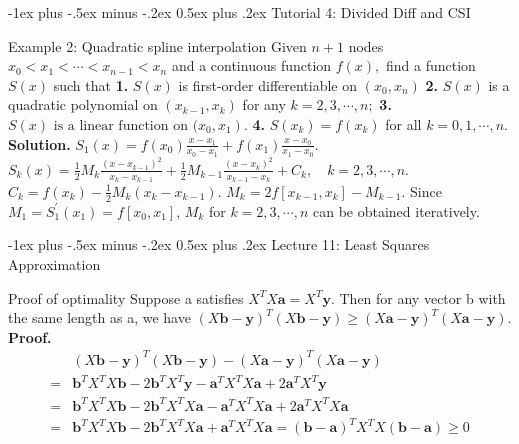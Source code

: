 \documentclass[10pt,landscape]{article}
\makeatletter
\renewcommand{\section}{\@startsection{section}{1}{0mm}%
                                {-1ex plus -.5ex minus -.2ex}%
                                {0.5ex plus .2ex}%
                                {\normalfont\large\bfseries}}
\theoremstyle{definition}
\newcommand{\thistheoremname}{}
\newtheorem*{genericthm*}{\thistheoremname}
\newenvironment{namedthm*}[1]
{\renewcommand{\thistheoremname}{#1}\begin{genericthm*}}
{\end{genericthm*}}
\makeatother
\begin{document}
\begin{multicols}{3}
	\section{Tutorial 4: Divided Diff and CSI}
	\begin{namedthm*}{Example 2: Quadratic spline interpolation}
		Given \(n+1\) nodes \(x_{0}<x_{1}<\cdots<x_{n-1}<x_{n}\) and a continuous function \(f(x),\)
		find a function \(S(x)\) such that
		\textbf{1.} \(S(x)\) is first-order differentiable on \(\left(x_{0}, x_{n}\right)\)
		\textbf{2.} \(S(x)\) is a quadratic polynomial on \(\left(x_{k-1}, x_{k}\right)\) for any \(k=2,3, \cdots, n ;\)
		\textbf{3.} \(\left.S(x) \text { is a linear function on (} x_{0}, x_{1}\right)\). \textbf{4.} \(S\left(x_{k}\right)=f\left(x_{k}\right)\) for all \(k=0,1, \cdots, n\).
		\\\textbf{Solution.} \(S_{1}(x)=f\left(x_{0}\right) \frac{x-x_{1}}{x_{0}-x_{1}}+f\left(x_{1}\right) \frac{x-x_{0}}{x_{1}-x_{0}}\). \(S_{k}(x)=\frac{1}{2} M_{k} \frac{\left(x-x_{k-1}\right)^{2}}{x_{k}-x_{k-1}}+\frac{1}{2} M_{k-1} \frac{\left(x-x_{k}\right)^{2}}{x_{k-1}-x_{k}}+C_{k}, \quad k=2,3, \cdots, n.\)\\\(C_{k}=f\left(x_{k}\right)-\frac{1}{2} M_{k}\left(x_{k}-x_{k-1}\right)\). \(M_{k}=2 f\left[x_{k-1}, x_{k}\right]-M_{k-1}\). Since \(M_{1}=S_{1}^{\prime}\left(x_{1}\right)=f\left[x_{0}, x_{1}\right]\), \(M_{k}\) for \(k=2,3, \cdots, n\) can be obtained iteratively.
	\end{namedthm*}
	\section{Lecture 11: Least Squares Approximation}
	\begin{namedthm*}{Proof of optimality}
		Suppose a satisfies \(
		X^{T} X \mathbf{a}=X^{T} \mathbf{y}.\) Then for any vector b with the same length as a, we have
		\(
		(X \mathbf{b}-\mathbf{y})^{T}(X \mathbf{b}-\mathbf{y}) \geqslant(X \mathbf{a}-\mathbf{y})^{T}(X \mathbf{a}-\mathbf{y})\). \textbf{Proof.}\[
			\begin{aligned}&(X \mathbf{b}-\mathbf{y})^{T}(X \mathbf{b}-\mathbf{y})-(X \mathbf{a}-\mathbf{y})^{T}(X \mathbf{a}-\mathbf{y}) \\=& \mathbf{b}^{T} X^{T} X \mathbf{b}-2 \mathbf{b}^{T} X^{T} \mathbf{y}-\mathbf{a}^{T} X^{T} X \mathbf{a}+2 \mathbf{a}^{T} X^{T} \mathbf{y} \\=& \mathbf{b}^{T} X^{T} X \mathbf{b}-2 \mathbf{b}^{T} X^{T} X \mathbf{a}-\mathbf{a}^{T} X^{T} X \mathbf{a}+2 \mathbf{a}^{T} X^{T} X \mathbf{a} \\=& \mathbf{b}^{T} X^{T} X \mathbf{b}-2 \mathbf{b}^{T} X^{T} X \mathbf{a}+\mathbf{a}^{T} X^{T} X \mathbf{a}=(\mathbf{b}-\mathbf{a})^{T} X^{T} X(\mathbf{b}-\mathbf{a}) \geqslant 0 \end{aligned}
		\]


\end{namedthm*}
\end{multicols}
\end{document}
